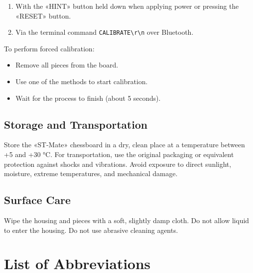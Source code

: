 \documentclass[a4paper,12pt]{article}
\begin{document}
\begin{enumerate}
    \item With the «HINT» button held down when applying power or pressing the «RESET» button.
    \item Via the terminal command \texttt{CALIBRATE\textbackslash{r}\textbackslash{n}} over Bluetooth.
\end{enumerate}

To perform forced calibration:
\begin{itemize}
    \item Remove all pieces from the board.
    \item Use one of the methods to start calibration.
    \item Wait for the process to finish (about 5 seconds).
\end{itemize}

\subsection{Storage and Transportation}
Store the «ST-Mate» chessboard in a dry, clean place at a temperature between +5 and +30 °C.
For transportation, use the original packaging or equivalent protection against shocks and vibrations.
Avoid exposure to direct sunlight, moisture, extreme temperatures, and mechanical damage.

\subsection{Surface Care}
Wipe the housing and pieces with a soft, slightly damp cloth. Do not allow liquid to enter the housing. Do not use abrasive cleaning agents.


\newpage
\section{List of Abbreviations}
\label{sec:abbreviations}
\end{document}

